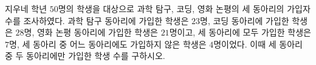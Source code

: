 지우네 학년 $50$명의 학생을 대상으로 과학 탐구, 코딩, 영화 논평의 세 동아리의 가입자 수를 조사하였다. 과학 탐구 동아리에 가입한 학생은 $23$명, 코딩 동아리에 가입한 학생은 $28$명, 영화 논평 동아리에 가입한 학생은 $21$명이고, 세 동아리에 모두 가입한 학생은 $7$명, 세 동아리 중 어느 동아리에도 가입하지 않은 학생은 $4$명이었다. 이때 세 동아리 중 두 동아리에만 가입한 학생 수를 구하시오.
